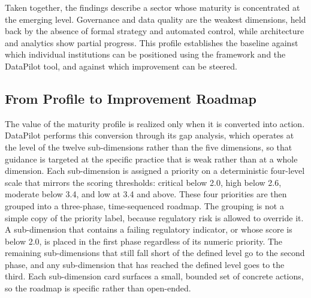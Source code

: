 Taken together, the findings describe a sector whose maturity is concentrated at the emerging level. Governance and data quality are the weakest dimensions, held back by the absence of formal strategy and automated control, while architecture and analytics show partial progress. This profile establishes the baseline against which individual institutions can be positioned using the framework and the DataPilot tool, and against which improvement can be steered.

\subsection{From Profile to Improvement Roadmap}

The value of the maturity profile is realized only when it is converted into action. DataPilot performs this conversion through its gap analysis, which operates at the level of the twelve sub-dimensions rather than the five dimensions, so that guidance is targeted at the specific practice that is weak rather than at a whole dimension. Each sub-dimension is assigned a priority on a deterministic four-level scale that mirrors the scoring thresholds: critical below 2.0, high below 2.6, moderate below 3.4, and low at 3.4 and above. These four priorities are then grouped into a three-phase, time-sequenced roadmap. The grouping is not a simple copy of the priority label, because regulatory risk is allowed to override it. A sub-dimension that contains a failing regulatory indicator, or whose score is below 2.0, is placed in the first phase regardless of its numeric priority. The remaining sub-dimensions that still fall short of the defined level go to the second phase, and any sub-dimension that has reached the defined level goes to the third. Each sub-dimension card surfaces a small, bounded set of concrete actions, so the roadmap is specific rather than open-ended.

